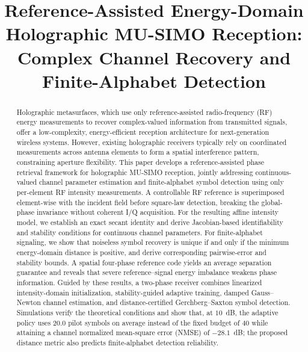 \documentclass[journal]{IEEEtran}
\begin{document}
\title{Reference-Assisted Energy-Domain Holographic MU-SIMO Reception: Complex Channel Recovery and Finite-Alphabet Detection}



\maketitle

\begin{abstract}
Holographic metasurfaces, which use only reference-assisted radio-frequency (RF) energy measurements to recover complex-valued information from transmitted signals, offer a low-complexity, energy-efficient reception architecture for next-generation wireless systems. However, existing holographic receivers typically rely on coordinated measurements across antenna elements to form a spatial interference pattern, constraining aperture flexibility. This paper develops a reference-assisted phase retrieval framework for
holographic MU-SIMO reception, jointly addressing continuous-valued
channel parameter estimation and finite-alphabet symbol detection
using only per-element RF intensity measurements. A controllable
RF reference is superimposed element-wise with the incident field before
square-law detection, breaking the global-phase invariance without coherent
I/Q acquisition. For the resulting affine intensity model, we establish an
exact secant identity and derive Jacobian-based identifiability and stability
conditions for continuous channel parameters. For finite-alphabet signaling,
we show that noiseless symbol recovery is unique if and only if the minimum
energy-domain distance is positive, and derive corresponding pairwise-error and
stability bounds. A spatial four-phase reference code yields an average
separation guarantee and reveals that severe reference--signal energy imbalance
weakens phase information. Guided by these results, a two-phase receiver combines
linearized intensity-domain initialization, stability-guided adaptive training,
damped Gauss--Newton channel estimation, and distance-certified
Gerchberg--Saxton symbol detection. Simulations verify the theoretical
conditions and show that, at $10$~dB, the adaptive policy uses $20.0$ pilot
symbols on average instead of the fixed budget of $40$ while attaining a
channel normalized mean-square error (NMSE) of $-28.1$~dB; the proposed distance metric also predicts
finite-alphabet detection reliability.
\end{abstract}
\end{document}
